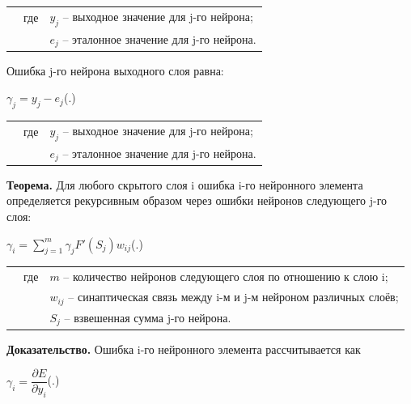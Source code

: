 	\begin{tabular}{p{}p{}p{}}
		& где  & $y_{j}$ {--} выходное значение для j-го нейрона; \\
		&      & $e_{j}$ {--} эталонное значение для j-го нейрона. \\
	\end{tabular}
	
	\par \redline Ошибка j-го нейрона выходного слоя равна:
	
	\formulaspace \par \redline 
	$\gamma_{j} = y_{j} - e_{j} $\hfill (\thechaptercntr .\theformulacntr) \redline
	\formulaspace \addtocounter{formulacntr}{1}
	
	\begin{tabular}{p{}p{}p{}}
		& где  & $y_{j}$ {--} выходное значение для j-го нейрона; \\
		&      & $e_{j}$ {--} эталонное значение для j-го нейрона. \\
	\end{tabular}
	
	\par \redline \textbf{Теорема.} Для любого скрытого слоя i ошибка i-го нейронного элемента определяется рекурсивным образом через ошибки нейронов следующего j-го слоя:
	
	\formulaspace \par \redline 
	$\gamma_{i} =  \sum \limits _{j=1}^{m} \gamma_{j} F'(S_{j}) w_{ij}$\hfill (\thechaptercntr .\theformulacntr) \redline
	\formulaspace \addtocounter{formulacntr}{1}
	
	\begin{tabular}{p{}p{}p{}}
		& где  & $m$ {--} количество нейронов следующего слоя по отношению к слою i; \\
		&      & $w_{ij}$ {--} синаптическая связь между i-м и j-м нейроном различных слоёв; \\
		&      & $S_{j}$ {--} взвешенная сумма j-го нейрона. \\
	\end{tabular}
	
	\par \redline \textbf{Доказательство.}  Ошибка i-го нейронного элемента рассчитывается как
	
	\formulaspace \par \redline 
	$\gamma_{i} =  \dfrac{\partial E}{\partial y_i}$\hfill (\thechaptercntr .\theformulacntr) \redline
	\formulaspace \addtocounter{formulacntr}{1}
	
